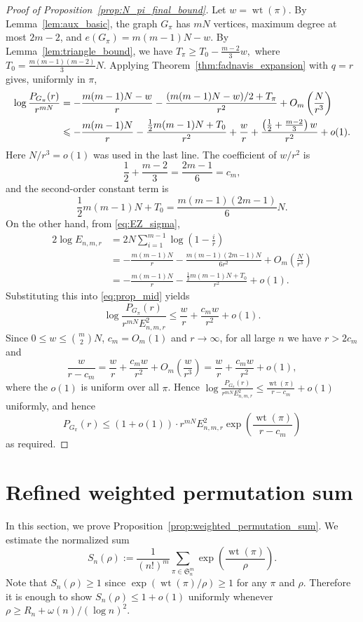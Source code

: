 \documentclass[10pt,a4paper]{amsart}
\renewcommand\leq{\leqslant}
\renewcommand\geq{\geqslant}
\renewcommand\le{\leqslant}
\renewcommand\ge{\geqslant}
\renewcommand\to{\rightarrow}
\newcommand{\wt}{\operatorname{wt}}
\begin{document}
\begin{proof}[Proof of Proposition~\ref{prop:N_pi_final_bound}]
Let $w=\wt(\pi)$. By Lemma~\ref{lem:aux_basic}, the graph $G_\pi$ has $mN$ vertices, maximum degree at most $2m-2$, and $e(G_\pi)=m(m-1)N-w.$
By Lemma~\ref{lem:triangle_bound}, we have $T_\pi\geq T_0-\frac{m-2}{3}w,$ where $T_0=\frac{m(m-1)(m-2)}3N$.
Applying Theorem~\ref{thm:fadnavis_expansion} with $q=r$ gives, uniformly in $\pi$,
\begin{align}
\log\frac{P_{G_\pi}(r)}{r^{mN}}
&=-\frac{m(m-1)N-w}{r}
  -\frac{(m(m-1)N-w)/2+T_\pi}{r^2}
  +O_m\left(\frac N{r^3}\right) \notag\\
&\leq
  -\frac{m(m-1)N}{r}
  -\frac{\frac12m(m-1)N+T_0}{r^2}
  +\frac wr+\frac{\left(\frac12+\frac{m-2}{3}\right)w}{r^2}
  +o(1). \label{eq:prop_mid}
\end{align}
Here $N/r^3=o(1)$ was used in the last line. The coefficient of $w/r^2$ is
\[
        \frac12+\frac{m-2}{3}=\frac{2m-1}{6}=c_m,
\]
and the second-order constant term is
\[
        \frac12m(m-1)N+T_0
        =\frac{m(m-1)(2m-1)}6N.
\]
On the other hand, from \eqref{eq:EZ_sigma},
\begin{align*}
2\log E_{n,m,r}
&=2N\sum_{i=1}^{m-1} \log\left(1-\frac ir\right)\\
&=-\frac{m(m-1)N}{r}
  -\frac{m(m-1)(2m-1)N}{6r^2}
  +O_m\left(\frac N{r^3}\right)\\
&=-\frac{m(m-1)N}{r}
  -\frac{\frac12m(m-1)N+T_0}{r^2}
  +o(1).
\end{align*}
Substituting this into \eqref{eq:prop_mid} yields
\[
        \log\frac{P_{G_\pi}(r)}{r^{mN}E_{n,m,r}^2}
        \leq \frac wr+\frac{c_mw}{r^2}+o(1).
\]
Since $0\leq w\leq\binom m2N$, $c_m=O_m(1)$ and $r\to\infty$, for all large $n$ we have $r>2c_m$ and
\[
\frac{w}{r-c_m}
=\frac wr+\frac{c_mw}{r^2}+O_m\left(\frac{w}{r^3}\right)
=\frac wr+\frac{c_mw}{r^2}+o(1),
\]
where the $o(1)$ is uniform over all $\pi$. Hence
$\log\frac{P_{G_\pi}(r)}{r^{mN}E_{n,m,r}^2}
 \le \frac{\wt(\pi)}{r-c_m}+o(1)$ uniformly, and hence
$$P_{G_\pi}(r)\le (1+o(1))\cdot r^{mN}E_{n,m,r}^2
\exp\left(\frac{\wt(\pi)}{r-c_m}\right)$$
as required.
\end{proof}
\medskip

\section{Refined weighted permutation sum}\label{sec:weighted_permutation_sum}

In this section, we prove Proposition~\ref{prop:weighted_permutation_sum}. We estimate the normalized sum
\begin{equation}\label{eq:core_sum}
        S_n(\rho):=\frac1{(n!)^m}
        \sum_{\pi\in\mathfrak S_n^m}\exp\left(\frac{\wt(\pi)}\rho\right).
\end{equation}
Note that $S_n(\rho)\geq 1$ since $\exp(\wt(\pi)/\rho)\geq1$ for any $\pi$ and $\rho$. Therefore it is enough to show 
$S_n(\rho)\leq 1+o(1)$ uniformly whenever \(\rho\ge R_n+\omega(n)/(\log n)^2\). 
\end{document}
